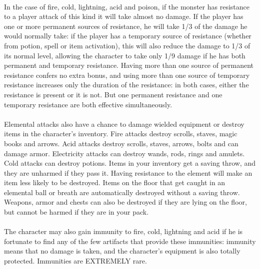 \paragraph{}In the case of fire, cold, lightning, acid and poison, if the monster
has resistance to a player attack of this kind it will take almost no
damage. If the player has one or more permanent sources of resistance,
he will take 1/3 of the damage he would normally take: if the player has
a temporary source of resistance (whether from potion, spell or item
activation), this will also reduce the damage to 1/3 of its normal
level, allowing the character to take only 1/9 damage if he has both
permanent and temporary resistance. Having more than one source of
permanent resistance confers no extra bonus, and using more than one
source of temporary resistance increases only the duration of the
resistance: in both cases, either the resistance is present or it is
not. But one permanent resistance and one temporary resistance are both
effective simultaneously.

\paragraph{}Elemental attacks also have a chance to damage wielded equipment or
destroy items in the character's inventory. Fire attacks destroy
scrolls, staves, magic books and arrows. Acid attacks destroy scrolls,
staves, arrows, bolts and can damage armor. Electricity attacks can
destroy wands, rods, rings and amulets. Cold attacks can destroy
potions. Items in your inventory get a saving throw, and they are
unharmed if they pass it. Having resistance to the element will make an
item less likely to be destroyed. Items on the floor that get caught in
an elemental ball or breath are automatically destroyed without a saving
throw. Weapons, armor and chests can also be destroyed if they are
lying on the floor, but cannot be harmed if they are in your pack.

\paragraph{}The character may also gain immunity to fire, cold, lightning and acid if
he is fortunate to find any of the few artifacts that provide these
immunities: immunity means that no damage is taken, and the character's
equipment is also totally protected. Immunities are EXTREMELY rare.

